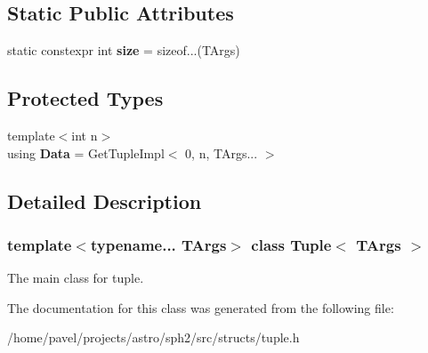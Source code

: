 \subsection*{Static Public Attributes}
\begin{DoxyCompactItemize}
\item 
\hypertarget{classTuple_aa41863bdc7903336e1a8efc866adeed3}{}\label{classTuple_aa41863bdc7903336e1a8efc866adeed3} 
static constexpr int {\bfseries size} = sizeof...(T\+Args)
\end{DoxyCompactItemize}
\subsection*{Protected Types}
\begin{DoxyCompactItemize}
\item 
\hypertarget{classTuple_a125f63b68c20afd0983d7b50f6da03e2}{}\label{classTuple_a125f63b68c20afd0983d7b50f6da03e2} 
{\footnotesize template$<$int n$>$ }\\using {\bfseries Data} = Get\+Tuple\+Impl$<$ 0, n, T\+Args... $>$
\end{DoxyCompactItemize}


\subsection{Detailed Description}
\subsubsection*{template$<$typename... T\+Args$>$\newline
class Tuple$<$ T\+Args $>$}

The main class for tuple. 

The documentation for this class was generated from the following file\+:\begin{DoxyCompactItemize}
\item 
/home/pavel/projects/astro/sph2/src/structs/tuple.\+h\end{DoxyCompactItemize}
